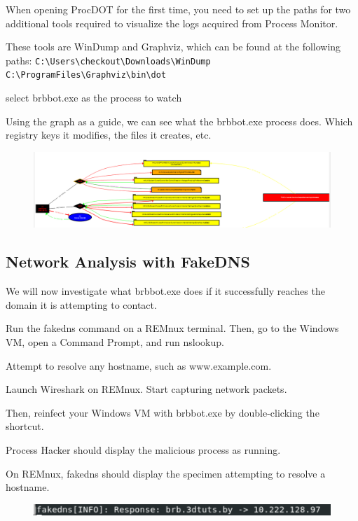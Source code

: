 \documentclass[]{project_plan}
\begin{document}
When opening ProcDOT for
the first time, you need to set up the paths for two additional tools required to
visualize the logs acquired from Process Monitor.

These tools are WinDump
and Graphviz, which can be found at the following paths:
\lstinline|C:\Users\checkout\Downloads\WinDump|
\lstinline|C:\ProgramFiles\Graphviz\bin\dot|

select brbbot.exe as the process to watch

Using the graph as a guide, we can see what the brbbot.exe process does.
Which registry keys it modifies, the files it creates, etc.

\begin{figure}[H]
  \centering
  \includegraphics[width=\linewidth]{procdot brbot.PNG}
\end{figure}

\subsection{Network Analysis with FakeDNS}
We will now investigate what brbbot.exe does if it successfully reaches the
domain it is attempting to contact.

Run the fakedns command on a REMnux terminal. Then, go to the Windows
VM, open a Command Prompt, and run nslookup.

Attempt to resolve any hostname, such as www.example.com.

Launch Wireshark on REMnux. Start capturing network packets.

Then, reinfect your Windows VM with brbbot.exe by double-clicking the shortcut.

Process Hacker should display the malicious process as running.

On REMnux, fakedns should display the specimen attempting to resolve a hostname.

\begin{figure}[H]
  \centering
  \includegraphics[width=\linewidth]{fakedns.png}
\end{figure}
\end{document}

